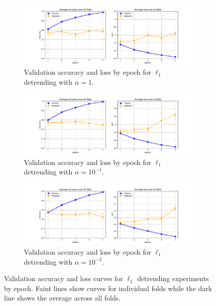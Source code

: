 \begin{figure}[p]
    \centering
    \begin{subfigure}{\textwidth}
        \centering
        \includegraphics[trim={3cm 0 3cm 0.8cm},clip,width=\textwidth]{img/ch5/e0_3_epochs_by_epoch.pdf}
        \caption{Validation accuracy and loss by epoch for $\ell_1$ detrending with $\alpha = 1$.}
        \label{fig:detrend-acc-loss-e0-epoch}
    \end{subfigure}

    \vspace{0.5cm}
    
    \begin{subfigure}{\textwidth}
        \centering
        \includegraphics[trim={3cm 0 3cm 0.8cm},clip,width=\textwidth]{img/ch5/e-1_3_epochs_by_epoch.pdf}
        \caption{Validation accuracy and loss by epoch for $\ell_1$ detrending with $\alpha = 10^{-1}$.}
        \label{fig:detrend-acc-loss-e-1-epoch}
    \end{subfigure}

    \vspace{0.5cm}
    
    \begin{subfigure}{\textwidth}
        \centering
        \includegraphics[trim={3cm 0 3cm 0.8cm},clip,width=\textwidth]{img/ch5/e-2_3_epochs_by_epoch.pdf}
        \caption{Validation accuracy and loss by epoch for $\ell_1$ detrending with $\alpha = 10^{-2}$.}
        \label{fig:detrend-acc-loss-e-2-epoch}
    \end{subfigure}
    \caption{Validation accuracy and loss curves for $\ell_1$ detrending experiments by epoch. Faint lines show curves for individual folds while the dark line shows the average across all folds.} 
    \label{fig:detrend-acc-loss-curves-epoch}
\end{figure}

